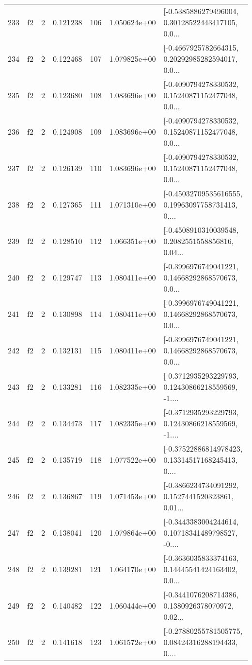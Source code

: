 \begin{tabular}{lllrlrl}
233 &  f2 &   2 &  0.121238 &  106 &  1.050624e+00 &  [-0.5385886279496004, 0.30128522443417105, 0.0... \\
234 &  f2 &   2 &  0.122468 &  107 &  1.079825e+00 &  [-0.4667925782664315, 0.20292985282594017, 0.0... \\
235 &  f2 &   2 &  0.123680 &  108 &  1.083696e+00 &  [-0.4090794278330532, 0.15240871152477048, 0.0... \\
236 &  f2 &   2 &  0.124908 &  109 &  1.083696e+00 &  [-0.4090794278330532, 0.15240871152477048, 0.0... \\
237 &  f2 &   2 &  0.126139 &  110 &  1.083696e+00 &  [-0.4090794278330532, 0.15240871152477048, 0.0... \\
238 &  f2 &   2 &  0.127365 &  111 &  1.071310e+00 &  [-0.45032709535616555, 0.19963097758731413, 0.... \\
239 &  f2 &   2 &  0.128510 &  112 &  1.066351e+00 &  [-0.4508910310039548, 0.2082551558856816, 0.04... \\
240 &  f2 &   2 &  0.129747 &  113 &  1.080411e+00 &  [-0.3996976749041221, 0.14668292868570673, 0.0... \\
241 &  f2 &   2 &  0.130898 &  114 &  1.080411e+00 &  [-0.3996976749041221, 0.14668292868570673, 0.0... \\
242 &  f2 &   2 &  0.132131 &  115 &  1.080411e+00 &  [-0.3996976749041221, 0.14668292868570673, 0.0... \\
243 &  f2 &   2 &  0.133281 &  116 &  1.082335e+00 &  [-0.3712935293229793, 0.12430866218559569, -1.... \\
244 &  f2 &   2 &  0.134473 &  117 &  1.082335e+00 &  [-0.3712935293229793, 0.12430866218559569, -1.... \\
245 &  f2 &   2 &  0.135719 &  118 &  1.077522e+00 &  [-0.37522886814978423, 0.13314517168245413, 0.... \\
246 &  f2 &   2 &  0.136867 &  119 &  1.071453e+00 &  [-0.3866234734091292, 0.1527441520323861, 0.01... \\
247 &  f2 &   2 &  0.138041 &  120 &  1.079864e+00 &  [-0.3443383004244614, 0.10718341489798527, -0.... \\
248 &  f2 &   2 &  0.139281 &  121 &  1.064170e+00 &  [-0.3636035833374163, 0.14445541424163402, 0.0... \\
249 &  f2 &   2 &  0.140482 &  122 &  1.060444e+00 &  [-0.3441076208714386, 0.1380926378070972, 0.02... \\
250 &  f2 &   2 &  0.141618 &  123 &  1.061572e+00 &  [-0.27880255781505775, 0.08424316288194433, 0.... \\

\end{tabular}
